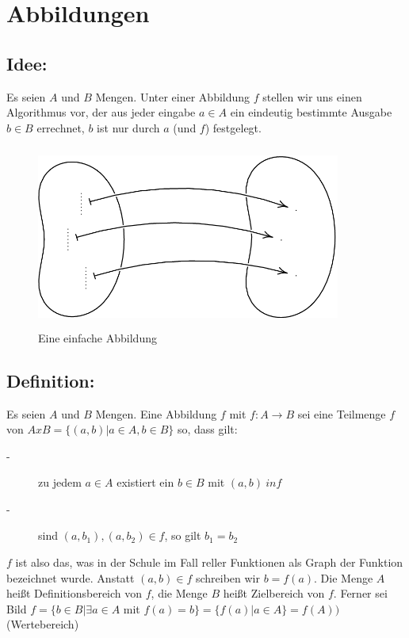 \section{Abbildungen}

\subsection{Idee:}
Es seien $A$ und $B$ Mengen. Unter einer Abbildung $f$ stellen wir uns einen Algorithmus vor, der aus jeder eingabe $a \in A$ ein eindeutig bestimmte Ausgabe $b \in B$ errechnet, $b$ ist nur durch $a$ (und $f$) festgelegt.

\begin{figure} [H]
\centering 
\includegraphics[width=10cm, height=6cm]{mainmatter/chapter1/pics/abbildunggenerell.png}
\caption{Eine einfache Abbildung} 
\end{figure}
%
%
%
\subsection{Definition:}

Es seien $A$ und $B$ Mengen. Eine Abbildung $f$ mit $ f:A \rightarrow B $ sei eine Teilmenge $f$ von $AxB = \{ (a,b) | a \in A, b \in B \}$ so, dass gilt:

\begin{description} 
\item[-] zu jedem $a \in A$ existiert ein $b \in B$ mit $(a,b) \ in f$ 
\item[-] sind $(a,b_{1}), (a,b_{2}) \in f$, so gilt $b_{1} = b_{2}$
\end{description}

$f$ ist also das, was in der Schule im Fall reller Funktionen als Graph der Funktion bezeichnet wurde. Anstatt $(a,b) \in f$ schreiben wir $b = f(a)$. Die Menge $A$ heißt Definitionsbereich von $f$, die Menge $B$ heißt Zielbereich von $f$. Ferner sei Bild $f = \{b \in B | \exists a \in A$ mit $f(a) = b\} = \{f(a) |  a \in A\} = f(A))$ (Wertebereich)
%
%
%
\newpage
